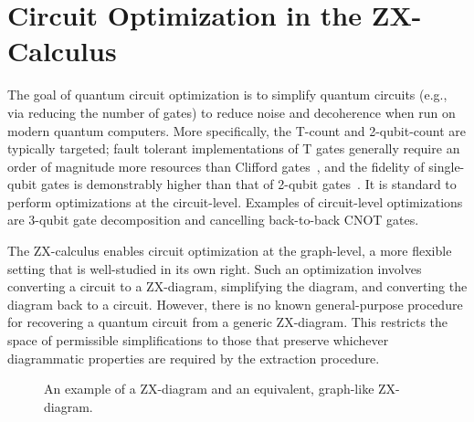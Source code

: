 \section{Circuit Optimization in the ZX-Calculus}\label{sec:zx-circ-opt}


The goal of quantum circuit optimization is to simplify quantum circuits (e.g., via reducing the number of gates) to reduce noise and decoherence when run on modern quantum computers.
More specifically, the T-count and 2-qubit-count are typically targeted; fault tolerant implementations of T gates generally require an order of magnitude more resources than Clifford gates~\cite{campbell2017roads}, and the fidelity of single-qubit gates is demonstrably higher than that of 2-qubit gates~\cite{ballance2016high}.
It is standard to perform optimizations at the circuit-level.
Examples of circuit-level optimizations are 3-qubit gate decomposition and cancelling back-to-back CNOT gates.

The ZX-calculus enables circuit optimization at the graph-level, a more flexible setting that is well-studied in its own right.
Such an optimization involves converting a circuit to a ZX-diagram, simplifying the diagram, and converting the diagram back to a circuit. %
However, there is no known general-purpose procedure for recovering a quantum circuit from a generic ZX-diagram.
This restricts the space of permissible simplifications to those that preserve whichever diagrammatic properties are required by the extraction procedure.


\begin{figure}
\centering
{}
\caption{An example of a ZX-diagram and an equivalent, graph-like ZX-diagram.}
\label{fig:graph-like}
\end{figure}

